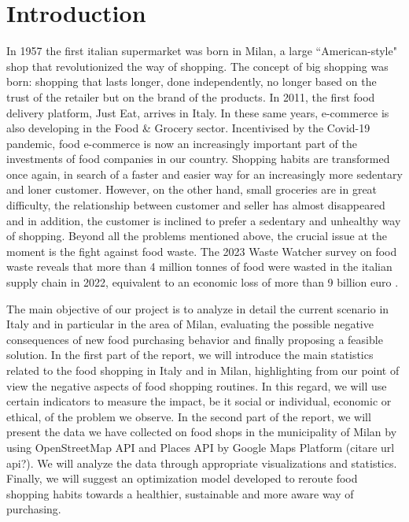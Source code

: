 \section*{Introduction}

In 1957 the first italian supermarket was born in Milan, a large ``American-style" shop that revolutionized the way of shopping. The concept of big shopping was born: shopping that lasts longer, done independently, no longer based on the trust of the retailer but on the brand of the products.
In 2011, the first food delivery platform, Just Eat, arrives in Italy. In these same years, e-commerce is also developing in the Food \& Grocery sector. Incentivised by the Covid-19 pandemic, food e-commerce is now an increasingly important part of the investments of food companies in our country. Shopping habits are transformed once again, in search of a faster and easier way for an increasingly more sedentary and loner customer. However, on the other hand, small groceries are in great difficulty, the relationship between customer and seller has almost disappeared and in addition, the customer is inclined to prefer a sedentary and unhealthy way of shopping. 
Beyond all the problems mentioned above, the crucial issue at the moment is the fight against food waste. The 2023 Waste Watcher survey on food waste reveals that more than 4 million tonnes of food were wasted in the italian supply chain in 2022, equivalent to an economic loss of more than 9 billion euro \cite{food_waste}.

\noindent The main objective of our project is to analyze in detail the current scenario in Italy and in particular in the area of Milan, evaluating the possible negative consequences of new food purchasing behavior and finally proposing a feasible solution.
In the first part of the report, we will introduce the main statistics related to the food shopping in Italy and in Milan, highlighting from our point of view the negative aspects of food shopping routines. In this regard, we will use certain indicators to measure the impact, be it social or individual, economic or ethical, of the problem we observe.
In the second part of the report, we will present the data we have collected on food shops in the municipality of Milan by using OpenStreetMap API and Places API by Google Maps Platform (citare url api?). We will analyze the data through appropriate visualizations and statistics.
Finally, we will suggest an optimization model developed to reroute food shopping habits towards a healthier, sustainable and more aware way of purchasing.


